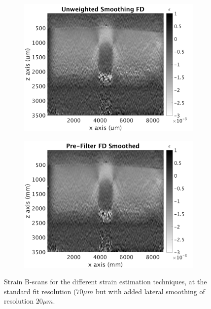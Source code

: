 \begin{figure}[h]
\begin{subfigure}{0.49\textwidth}
        \includegraphics[width=\textwidth]{appendix_figs/uwfd_fr70_lr20.png}
    \end{subfigure}
    \begin{subfigure}{0.49\textwidth}
    	\centering
        \includegraphics[width=\textwidth]{appendix_figs/fdsm_fr70_lr20.png}
    \end{subfigure}    
    \caption{Strain B-scans for the different strain estimation techniques, at the standard fit resolution ($70 \mu m$ but with added lateral smoothing of resolution $20 \mu m$.}
    \label{fr70_lr20}
\end{figure}

